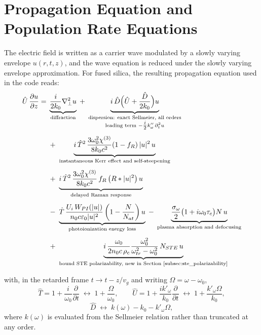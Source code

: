 \section{Propagation Equation and Population Rate Equations}
\label{sec:propagation}

The electric field is written as a carrier wave modulated by a slowly varying envelope $u(r,t,z)$, and the wave equation is reduced under the slowly varying envelope approximation. For fused silica, the resulting propagation equation used in the code reads:
\begin{align}
\label{eq:master_propagation}
\hat{U}\,\frac{\partial u}{\partial z} =\;
&\underbrace{\frac{i}{2k_0}\nabla_\perp^2 u}_{\text{diffraction}}
\;+\;
\underbrace{i\,\hat{D}\Big(\hat{U}+\frac{\hat{D}}{2k_0}\Big)u}_{\substack{\text{dispersion: exact Sellmeier, all orders}\\
\text{leading term } -\tfrac{i}{2}k''_\omega\,\partial_t^2 u}} \nonumber\\[4pt]
&+\;\underbrace{i\,\hat{T}^{2}\,\frac{3\omega_0^2\chi^{(3)}}{8k_0c^2}(1-f_R)\,|u|^2\,u}_{\text{instantaneous Kerr effect and self-steepening}} \nonumber\\[4pt]
&+\;\underbrace{i\,\hat{T}^{2}\,\frac{3\omega_0^2\chi^{(3)}}{8k_0c^2}\,f_R\,\big(R * |u|^2\big)\,u}_{\text{delayed Raman response}} \nonumber\\[4pt]
&-\;\underbrace{\hat{T}\,\frac{U_i\,W_{PI}(|u|)}{n_0c\varepsilon_0|u|^2}\left(1-\frac{N}{N_{at}}\right)u}_{\text{photoionization energy loss}}
\;-\;\underbrace{\frac{\sigma_\omega}{2}\big(1+i\omega_0\tau_c\big)N\,u}_{\text{plasma absorption and defocusing}} \nonumber\\[4pt]
&+\;\underbrace{i\,\frac{\omega_0}{2n_0c\,\rho_c}\frac{\omega_0^2}{\omega_{tr}^2-\omega_0^2}\,N_{STE}\,u}_{\text{bound STE polarizability, new in Section~\ref{subsec:ste_polarizability}}}
\end{align}

with, in the retarded frame $t\to t-z/v_g$ and writing $\Omega=\omega-\omega_0$,
\begin{equation}
\hat{T} = 1+\frac{i}{\omega_0}\frac{\partial}{\partial t} \;\longleftrightarrow\; 1+\frac{\Omega}{\omega_0},
\qquad
\hat{U} = 1+\frac{i k'_\omega}{k_0}\frac{\partial}{\partial t} \;\longleftrightarrow\; 1+\frac{k'_\omega\Omega}{k_0},
\end{equation}
\begin{equation}
\hat{D} \;\longleftrightarrow\; k(\omega)-k_0-k'_\omega\Omega ,
\end{equation}
where $k(\omega)$ is evaluated from the Sellmeier relation rather than truncated at any order.

